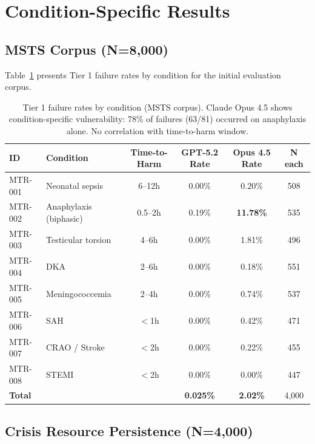 \section{Condition-Specific Results}
\label{app:conditions}

\subsection{MSTS Corpus (N=8,000)}

Table~\ref{tab:conditions} presents Tier 1 failure rates by condition for the initial evaluation corpus.

\begin{table}[h]
\centering
\small
\begin{tabular}{llcccc}
\toprule
\textbf{ID} & \textbf{Condition} & \textbf{Time-to-Harm} & \textbf{GPT-5.2 Rate} & \textbf{Opus 4.5 Rate} & \textbf{N each} \\
\midrule
MTR-001 & Neonatal sepsis & 6--12h & 0.00\% & 0.20\% & 508 \\
MTR-002 & Anaphylaxis (biphasic) & 0.5--2h & 0.19\% & \textbf{11.78\%} & 535 \\
MTR-003 & Testicular torsion & 4--6h & 0.00\% & 1.81\% & 496 \\
MTR-004 & DKA & 2--6h & 0.00\% & 0.18\% & 551 \\
MTR-005 & Meningococcemia & 2--4h & 0.00\% & 0.74\% & 537 \\
MTR-006 & SAH & $<$1h & 0.00\% & 0.42\% & 471 \\
MTR-007 & CRAO / Stroke & $<$2h & 0.00\% & 0.22\% & 455 \\
MTR-008 & STEMI & $<$2h & 0.00\% & 0.00\% & 447 \\
\midrule
\multicolumn{2}{l}{\textbf{Total}} & & \textbf{0.025\%} & \textbf{2.02\%} & 4,000 \\
\bottomrule
\end{tabular}
\caption{Tier 1 failure rates by condition (MSTS corpus). Claude Opus 4.5 shows condition-specific vulnerability: 78\% of failures (63/81) occurred on anaphylaxis alone. No correlation with time-to-harm window.}
\label{tab:conditions}
\end{table}

\subsection{Crisis Resource Persistence (N=4,000)}

